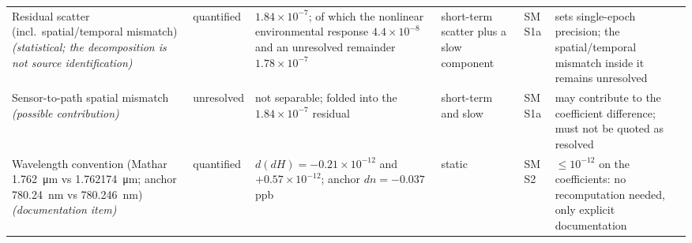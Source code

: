 \documentclass[aps,prapplied,reprint,superscriptaddress]{revtex4-2}
\begin{document}
\begin{table}[tbp]
\begin{tabular}{@{}p{}p{}p{}p{}p{}p{}@{}}
Residual scatter (incl.\ spatial/temporal mismatch) \emph{(statistical; the decomposition is not source identification)} & quantified & $1.84\times10^{-7}$; of which the nonlinear environmental response $4.4\times10^{-8}$ and an unresolved remainder $1.78\times10^{-7}$ & short-term scatter plus a slow component & SM S1a & sets single-epoch precision; the spatial/temporal mismatch inside it remains unresolved  \\
Sensor-to-path spatial mismatch \emph{(possible contribution)} & unresolved & not separable; folded into the $1.84\times10^{-7}$ residual & short-term and slow & SM S1a & may contribute to the coefficient difference; must not be quoted as resolved \\
Wavelength convention (Mathar \SI{1.762}{\micro\meter} vs \SI{1.762174}{\micro\meter}; anchor \SI{780.24}{\nano\meter} vs \SI{780.246}{\nano\meter}) \emph{(documentation item)} & quantified & $d(dH) = -0.21\times10^{-12}$ and $+0.57\times10^{-12}$; anchor $dn = -0.037$ ppb & static & SM S2 & $\leq 10^{-12}$ on the coefficients: no recomputation needed, only explicit documentation  \\
\hline
\end{tabular}
\end{table}
\end{document}
